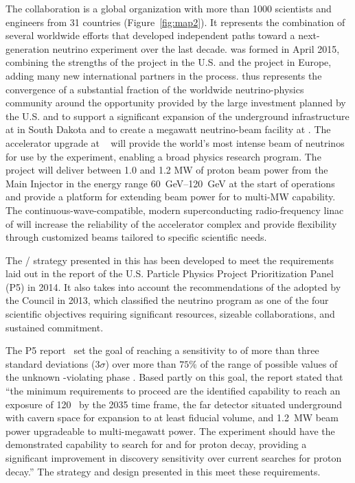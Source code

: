 The  collaboration is a global organization with more than \num{1000} scientists and engineers from \num{31} countries (Figure~\ref{fig:map2}). It represents the combination of several worldwide efforts that developed independent paths toward a next-generation  neutrino experiment over the last decade.  was formed in April 2015, combining the strengths of the  project in the U.S. and the  project in Europe, adding many new international partners in the process.  thus represents the convergence of a substantial fraction of the worldwide neutrino-physics community around the opportunity provided by the large investment planned by the U.S.  and  to support a significant expansion of the underground infrastructure at  in South Dakota and to create a megawatt neutrino-beam facility at . 
The  accelerator upgrade at ~\cite{pip2-2013} will provide the world's most intense beam of neutrinos for use by the %
 experiment, enabling a broad physics research program.  
The  project will deliver between 1.0 and 1.2 MW of proton beam power from the  Main Injector in the energy range \SIrange{60}{120}{\GeV} at the start of  operations and provide a platform for extending beam power for  to multi-MW capability. %
The continuous-wave-compatible, modern superconducting radio-frequency linac of  will increase the reliability of the  accelerator complex and provide flexibility through customized  beams tailored to specific scientific needs.  

The / strategy presented in this  has been developed to meet the requirements laid out in the report of the U.S. Particle Physics Project Prioritization Panel (P5) in 2014. It also takes into account the recommendations of the  adopted by the  Council in 2013, which classified the  neutrino program as one of the four scientific objectives requiring significant resources, sizeable collaborations, and sustained commitment.


The P5 report~\cite{p5report} set the goal of reaching a sensitivity to  of more than three standard deviations (\num{3}$\sigma$) over more than $75\%$ 
of the range of possible values of the unknown -violating phase \deltacp.
Based partly on this goal, the report stated that ``the 
minimum requirements to proceed are the identified capability to reach an exposure 
of \num{120}~\ktMWyr{} by the 2035 time frame, the far detector situated underground 
with cavern space for expansion to at least \fdfiducialmass {} fiducial volume, and \SI{1.2}{MW} beam power upgradeable to multi-megawatt power.
The experiment should have the demonstrated 
capability to search for  and for proton decay, providing a significant 
improvement in discovery sensitivity over current searches for proton decay.'' The strategy and design presented in this  meet these requirements.

